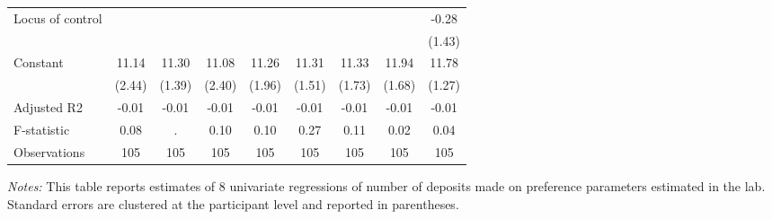 \begin{table}[ht]
{\begin{threeparttable}
\begin{tabular}{l*{8}{c}}
Locus of control&         &         &         &         &         &         &         &    -0.28\\
                &         &         &         &         &         &         &         &   (1.43)\\
Constant        &    11.14&    11.30&    11.08&    11.26&    11.31&    11.33&    11.94&    11.78\\
                &   (2.44)&   (1.39)&   (2.40)&   (1.96)&   (1.51)&   (1.73)&   (1.68)&   (1.27)\\
\midrule
Adjusted R2     &    -0.01&    -0.01&    -0.01&    -0.01&    -0.01&    -0.01&    -0.01&    -0.01\\
F-statistic     &     0.08&        .&     0.10&     0.10&     0.27&     0.11&     0.02&     0.04\\
Observations    &      105&      105&      105&      105&      105&      105&      105&      105\\
\bottomrule \end{tabular} \begin{tablenotes}[flushleft] \footnotesize \item \emph{Notes:} This table reports estimates of 8 univariate regressions of number of deposits made on preference parameters estimated in the lab. Standard errors are clustered at the participant level and reported in parentheses. \end{tablenotes} \end{threeparttable} } \end{table}

